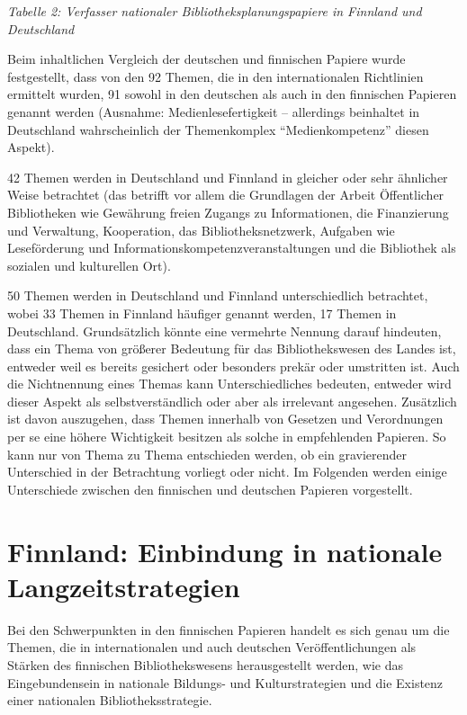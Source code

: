 \documentclass[a4paper,
fontsize=11pt,
oneside,
numbers=noperiodatend,
parskip=half-,
bibliography=totoc,
final
]{scrartcl}
\begin{document}
\emph{Tabelle 2: Verfasser nationaler Bibliotheksplanungspapiere in
Finnland und Deutschland}

Beim inhaltlichen Vergleich der deutschen und finnischen Papiere wurde
festgestellt, dass von den 92 Themen, die in den internationalen
Richtlinien ermittelt wurden, 91 sowohl in den deutschen als auch in den
finnischen Papieren genannt werden (Ausnahme: Medienlesefertigkeit --
allerdings beinhaltet in Deutschland wahrscheinlich der Themenkomplex
\enquote{Medienkompetenz} diesen Aspekt).

42 Themen werden in Deutschland und Finnland in gleicher oder sehr
ähnlicher Weise betrachtet (das betrifft vor allem die Grundlagen der
Arbeit Öffentlicher Bibliotheken wie Gewährung freien Zugangs zu
Informationen, die Finanzierung und Verwaltung, Kooperation, das
Bibliotheksnetzwerk, Aufgaben wie Leseförderung und
Informationskompetenzveranstaltungen und die Bibliothek als sozialen und
kulturellen Ort).

50 Themen werden in Deutschland und Finnland unterschiedlich betrachtet,
wobei 33 Themen in Finnland häufiger genannt werden, 17 Themen in
Deutschland. Grundsätzlich könnte eine vermehrte Nennung darauf
hindeuten, dass ein Thema von größerer Bedeutung für das
Bibliothekswesen des Landes ist, entweder weil es bereits gesichert oder
besonders prekär oder umstritten ist. Auch die Nichtnennung eines Themas
kann Unterschiedliches bedeuten, entweder wird dieser Aspekt als
selbstverständlich oder aber als irrelevant angesehen. Zusätzlich ist
davon auszugehen, dass Themen innerhalb von Gesetzen und Verordnungen
per se eine höhere Wichtigkeit besitzen als solche in empfehlenden
Papieren. So kann nur von Thema zu Thema entschieden werden, ob ein
gravierender Unterschied in der Betrachtung vorliegt oder nicht. Im
Folgenden werden einige Unterschiede zwischen den finnischen und
deutschen Papieren vorgestellt.

\hypertarget{finnland-einbindung-in-nationale-langzeitstrategien}{%
\section{Finnland: Einbindung in nationale
Langzeitstrategien}\label{finnland-einbindung-in-nationale-langzeitstrategien}}

Bei den Schwerpunkten in den finnischen Papieren handelt es sich genau
um die Themen, die in internationalen und auch deutschen
Veröffentlichungen als Stärken des finnischen Bibliothekswesens
herausgestellt werden, wie das Eingebundensein in nationale Bildungs-
und Kulturstrategien und die Existenz einer nationalen
Bibliotheksstrategie.
\end{document}
